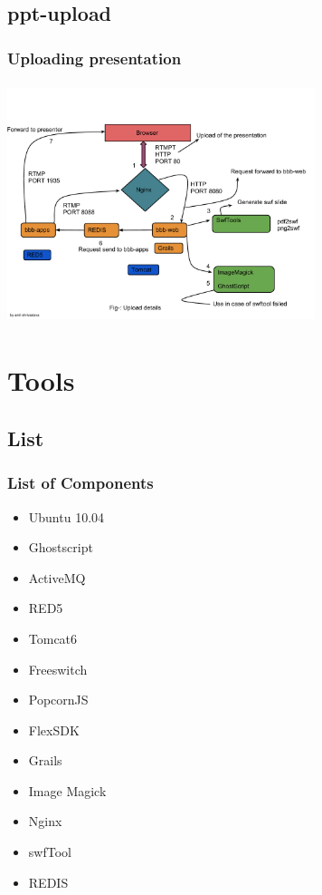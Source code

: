 \documentclass{beamer}
\begin{document}
\subsection*{ppt-upload}
\begin{frame}
\frametitle{Uploading presentation}

\includegraphics[height=70mm,width=90mm,angle=360]{./images/bbb-upload.pdf}
\end{frame}

\section{Tools}
\subsection*{List}
\begin{frame}
\frametitle{List of Components }
\begin{small}

\begin{itemize}
        \item{Ubuntu 10.04}
	\item{Ghostscript}
        \item{ActiveMQ}
        \item{RED5}
        \item{Tomcat6}
	\item{Freeswitch}
	\item{PopcornJS}
	\item{FlexSDK}	
	\item{Grails}
	\item{Image Magick}
	\item{Nginx}
	\item{swfTool}
	\item{REDIS}
 \end{itemize}
	\end{small}
\end{frame}
\end{document}
